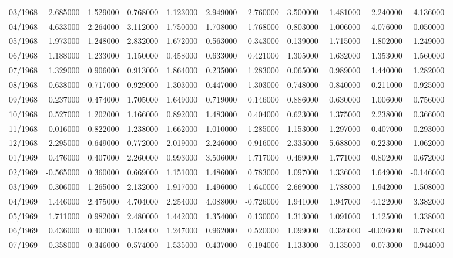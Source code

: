 \begin{tabular}{lrrrrrrrrrr}
03/1968 & 2.685000 & 1.529000 & 0.768000 & 1.123000 & 2.949000 & 2.760000 & 3.500000 & 1.481000 & 2.240000 & 4.136000 \\
04/1968 & 4.633000 & 2.264000 & 3.112000 & 1.750000 & 1.708000 & 1.768000 & 0.803000 & 1.006000 & 4.076000 & 0.050000 \\
05/1968 & 1.973000 & 1.248000 & 2.832000 & 1.672000 & 0.563000 & 0.343000 & 0.139000 & 1.715000 & 1.802000 & 1.249000 \\
06/1968 & 1.188000 & 1.233000 & 1.150000 & 0.458000 & 0.633000 & 0.421000 & 1.305000 & 1.632000 & 1.353000 & 1.560000 \\
07/1968 & 1.329000 & 0.906000 & 0.913000 & 1.864000 & 0.235000 & 1.283000 & 0.065000 & 0.989000 & 1.440000 & 1.282000 \\
08/1968 & 0.638000 & 0.717000 & 0.929000 & 1.303000 & 0.447000 & 1.303000 & 0.748000 & 0.840000 & 0.211000 & 0.925000 \\
09/1968 & 0.237000 & 0.474000 & 1.705000 & 1.649000 & 0.719000 & 0.146000 & 0.886000 & 0.630000 & 1.006000 & 0.756000 \\
10/1968 & 0.527000 & 1.202000 & 1.166000 & 0.892000 & 1.483000 & 0.404000 & 0.623000 & 1.375000 & 2.238000 & 0.366000 \\
11/1968 & -0.016000 & 0.822000 & 1.238000 & 1.662000 & 1.010000 & 1.285000 & 1.153000 & 1.297000 & 0.407000 & 0.293000 \\
12/1968 & 2.295000 & 0.649000 & 0.772000 & 2.019000 & 2.246000 & 0.916000 & 2.335000 & 5.688000 & 0.223000 & 1.062000 \\
01/1969 & 0.476000 & 0.407000 & 2.260000 & 0.993000 & 3.506000 & 1.717000 & 0.469000 & 1.771000 & 0.802000 & 0.672000 \\
02/1969 & -0.565000 & 0.360000 & 0.669000 & 1.151000 & 1.486000 & 0.783000 & 1.097000 & 1.336000 & 1.649000 & -0.146000 \\
03/1969 & -0.306000 & 1.265000 & 2.132000 & 1.917000 & 1.496000 & 1.640000 & 2.669000 & 1.788000 & 1.942000 & 1.508000 \\
04/1969 & 1.446000 & 2.475000 & 4.704000 & 2.254000 & 4.088000 & -0.726000 & 1.941000 & 1.947000 & 4.122000 & 3.382000 \\
05/1969 & 1.711000 & 0.982000 & 2.480000 & 1.442000 & 1.354000 & 0.130000 & 1.313000 & 1.091000 & 1.125000 & 1.338000 \\
06/1969 & 0.436000 & 0.403000 & 1.159000 & 1.247000 & 0.962000 & 0.520000 & 1.099000 & 0.326000 & -0.036000 & 0.768000 \\
07/1969 & 0.358000 & 0.346000 & 0.574000 & 1.535000 & 0.437000 & -0.194000 & 1.133000 & -0.135000 & -0.073000 & 0.944000 \\

\end{tabular}
